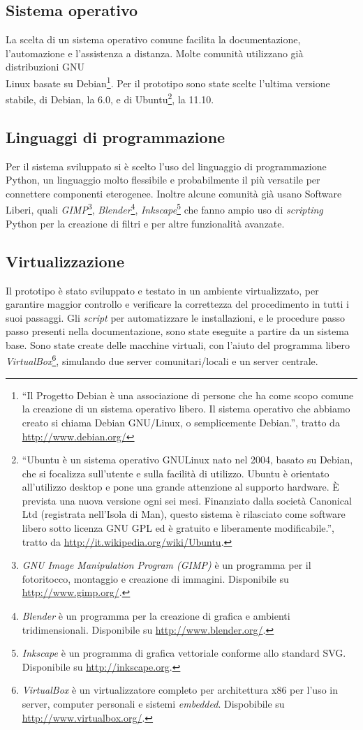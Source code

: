 \subsection{Sistema operativo}
La scelta di un sistema operativo comune facilita la documentazione,
l'automazione e l'assistenza a distanza. Molte comunità utilizzano già
distribuzioni GNU\\Linux basate su Debian\footnote{``Il Progetto
  Debian è una associazione di persone che ha come scopo comune la
  creazione di un sistema operativo libero. Il sistema operativo che
  abbiamo creato si chiama Debian GNU/Linux, o semplicemente
  Debian.'', tratto da \url{http://www.debian.org/}}. Per il prototipo
sono state scelte l'ultima versione stabile, di Debian, la 6.0, e di
Ubuntu\footnote{``Ubuntu è un sistema operativo GNU\/Linux nato nel
  2004, basato su Debian, che si focalizza sull'utente e sulla
  facilità di utilizzo. Ubuntu è orientato all'utilizzo desktop e pone
  una grande attenzione al supporto hardware. È prevista una nuova
  versione ogni sei mesi.  Finanziato dalla società Canonical Ltd
  (registrata nell'Isola di Man), questo sistema è rilasciato come
  software libero sotto licenza GNU GPL ed è gratuito e liberamente
  modificabile.'', tratto da
  \url{http://it.wikipedia.org/wiki/Ubuntu}.}, la 11.10.

\subsection{Linguaggi di programmazione}
Per il sistema sviluppato si è scelto l'uso del linguaggio di
programmazione Python, un linguaggio molto flessibile e probabilmente
il più versatile per connettere componenti eterogenee. Inoltre alcune
comunità già usano Software Liberi, quali
\emph{GIMP}\footnote{\emph{GNU Image Manipulation Program (GIMP)} è un
  programma per il fotoritocco, montaggio e creazione di
  immagini. Disponibile su \url{http://www.gimp.org/}.},
\emph{Blender}\footnote{\emph{Blender} è un programma per la creazione
  di grafica e ambienti tridimensionali. Disponibile su
  \url{http://www.blender.org/}.},
\emph{Inkscape}\footnote{\emph{Inkscape} è un programma di grafica
  vettoriale conforme allo standard SVG. Disponibile su
  \url{http://inkscape.org}.} che fanno ampio uso di \emph{scripting}
Python per la creazione di filtri e per altre funzionalità avanzate.

\subsection{Virtualizzazione}
Il prototipo è stato sviluppato e testato in un ambiente
virtualizzato, per garantire maggior controllo e verificare la
correttezza del procedimento in tutti i suoi passaggi. Gli
\emph{script} per automatizzare le installazioni, e le procedure passo
passo presenti nella documentazione, sono state eseguite a partire da
un sistema base. Sono state create delle macchine virtuali, con
l'aiuto del programma libero
\emph{VirtualBox}\footnote{\emph{VirtualBox} è un virtualizzatore
  completo per architettura x86 per l'uso in server, computer
  personali e sistemi \emph{embedded}. Dispobibile su
  \url{http://www.virtualbox.org/}.}, simulando due server
comunitari/locali e un server centrale.


